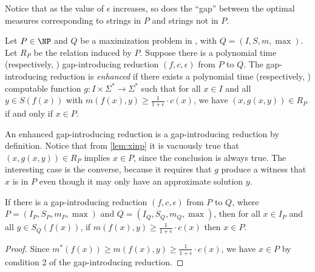 \documentclass[]{article}
\begin{document}
Notice that as the value of $\epsilon$ increases, so does the ``gap'' between the optimal measures corresponding to strings in $P$ and strings not in $P$.

\begin{definition}
  Let $P\in\NP$ and $Q$ be a maximization problem in \NPO, with $Q = (I, S, m, \max)$.
  Let $R_P$ be the \NP{} relation induced by $P$.
  Suppose there is a polynomial time (respectively, \NC) gap-introducing reduction $(f, c, \epsilon)$ from $P$ to $Q$.
  The gap-introducing reduction is \emph{enhanced} if there exists a polynomial time (respectively, \NC) computable function $g \colon I \times \Sigma^* \to \Sigma^*$ such that for all $x \in I$ and all $y \in S(f(x))$ with $m(f(x), y) \geq \frac{1}{1 + \epsilon} \cdot c(x)$, we have $\left(x, g(x, y)\right) \in R_P$ if and only if $x \in P$.
\end{definition}

An enhanced gap-introducing reduction is a gap-introducing reduction by definition.
Notice that from \autoref{lem:xinp} it is vacuously true that $\left(x, g(x, y)\right) \in R_P$ implies $x \in P$, since the conclusion is always true.
The interesting case is the converse, because it requires that $g$ produce a witness that $x$ is in $P$ even though it may only have an approximate solution $y$.

\begin{lemma}\label{lem:xinp}
  If there is a gap-introducing reduction $(f, c, \epsilon)$ from $P$ to $Q$, where $P = (I_P, S_P, m_P, \max)$ and $Q = (I_Q, S_Q, m_Q, \max)$, then for all $x \in I_P$ and all $y \in S_Q(f(x))$, if $m(f(x), y) \geq \frac{1}{1 + \epsilon} \cdot c(x)$ then $x \in P$.
\end{lemma}
\begin{proof}
  Since $m^*(f(x)) \geq m(f(x), y) \geq \frac{1}{1 + \epsilon} \cdot c(x)$, we have $x \in P$ by condition 2 of the gap-introducing reduction.
\end{proof}
\end{document}
